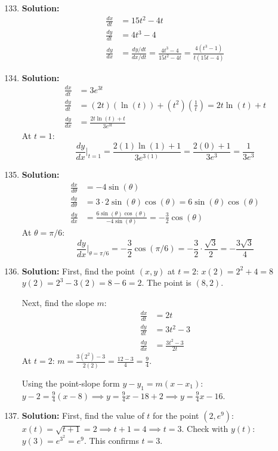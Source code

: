 \documentclass{article}
\begin{document}
\begin{enumerate}
    \setcounter{enumi}{132}
\item \textbf{Solution:}
\begin{align*}
\frac{dx}{dt} &= 15t^2 - 4t \\
\frac{dy}{dt} &= 4t^3 - 4 \\
\frac{dy}{dx} &= \frac{dy/dt}{dx/dt} = \frac{4t^3 - 4}{15t^2 - 4t} = \frac{4(t^3 - 1)}{t(15t - 4)}
\end{align*}

\item \textbf{Solution:}
\begin{align*}
\frac{dx}{dt} &= 3e^{3t} \\
\frac{dy}{dt} &= (2t)(\ln(t)) + (t^2)\left(\frac{1}{t}\right) = 2t\ln(t) + t \\
\frac{dy}{dx} &= \frac{2t\ln(t) + t}{3e^{3t}}
\end{align*}
At $t=1$:
\[ \frac{dy}{dx}\bigg|_{t=1} = \frac{2(1)\ln(1) + 1}{3e^{3(1)}} = \frac{2(0) + 1}{3e^3} = \frac{1}{3e^3} \]

\item \textbf{Solution:}
\begin{align*}
\frac{dx}{d\theta} &= -4\sin(\theta) \\
\frac{dy}{d\theta} &= 3 \cdot 2\sin(\theta)\cos(\theta) = 6\sin(\theta)\cos(\theta) \\
\frac{dy}{dx} &= \frac{6\sin(\theta)\cos(\theta)}{-4\sin(\theta)} = -\frac{3}{2}\cos(\theta)
\end{align*}
At $\theta = \pi/6$:
\[ \frac{dy}{dx}\bigg|_{\theta=\pi/6} = -\frac{3}{2}\cos(\pi/6) = -\frac{3}{2} \cdot \frac{\sqrt{3}}{2} = -\frac{3\sqrt{3}}{4} \]

\item \textbf{Solution:} First, find the point $(x,y)$ at $t=2$:
$x(2) = 2^2 + 4 = 8$
$y(2) = 2^3 - 3(2) = 8 - 6 = 2$. The point is $(8, 2)$.

Next, find the slope $m$:
\begin{align*}
\frac{dx}{dt} &= 2t \\
\frac{dy}{dt} &= 3t^2 - 3 \\
\frac{dy}{dx} &= \frac{3t^2 - 3}{2t}
\end{align*}
At $t=2$: $m = \frac{3(2^2) - 3}{2(2)} = \frac{12-3}{4} = \frac{9}{4}$.

Using the point-slope form $y - y_1 = m(x - x_1)$:
$y - 2 = \frac{9}{4}(x - 8) \implies y = \frac{9}{4}x - 18 + 2 \implies y = \frac{9}{4}x - 16$.

\item \textbf{Solution:} First, find the value of $t$ for the point $(2, e^9)$:
$x(t) = \sqrt{t+1} = 2 \implies t+1 = 4 \implies t=3$.
Check with $y(t)$: $y(3) = e^{3^2} = e^9$. This confirms $t=3$.


\end{enumerate}
\end{document}
